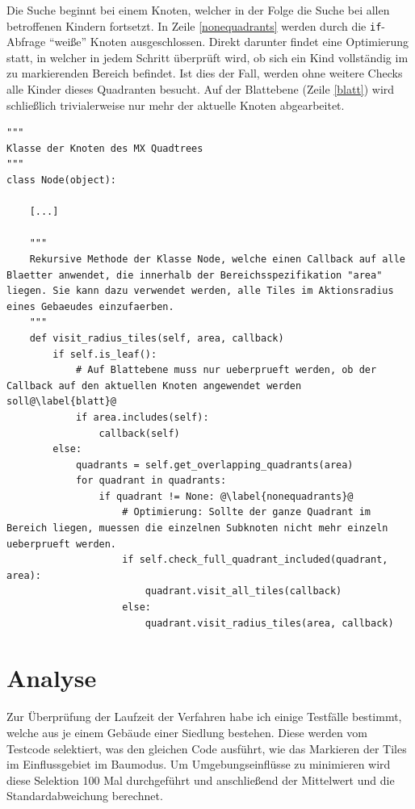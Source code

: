 \documentclass[%
			paper=a4,%
			DIV12,
			liststotoc,
			bibtotoc,
			draft=false,%
			titlepage,
			numbers=noendperiod
			]{scrartcl}
\newcommand{\inlinecode}[1]{\mbox{\texttt{#1}}}
\begin{document}
Die Suche beginnt bei einem Knoten, welcher in der Folge die Suche bei allen betroffenen Kindern fortsetzt.
In Zeile \ref{nonequadrants} werden durch die \inlinecode{if}-Abfrage "`weiße"' Knoten ausgeschlossen.
Direkt darunter findet eine Optimierung statt, in welcher in jedem Schritt überprüft wird, ob sich ein Kind vollständig im zu markierenden Bereich befindet.
Ist dies der Fall, werden ohne weitere Checks alle Kinder dieses Quadranten besucht.
Auf der Blattebene (Zeile \ref{blatt}) wird schließlich trivialerweise nur mehr der aktuelle Knoten abgearbeitet.

\begin{lstlisting}[float=h,caption=Python-ähnlicher Pseudocode zur Lösung des Markierungsproblems,label=visit_rad]
"""
Klasse der Knoten des MX Quadtrees
"""
class Node(object):

	[...]

	"""
	Rekursive Methode der Klasse Node, welche einen Callback auf alle Blaetter anwendet, die innerhalb der Bereichsspezifikation "area" liegen. Sie kann dazu verwendet werden, alle Tiles im Aktionsradius eines Gebaeudes einzufaerben.
	"""
	def visit_radius_tiles(self, area, callback)
		if self.is_leaf():
			# Auf Blattebene muss nur ueberprueft werden, ob der Callback auf den aktuellen Knoten angewendet werden soll@\label{blatt}@
			if area.includes(self):
				callback(self)
		else:
			quadrants = self.get_overlapping_quadrants(area)
			for quadrant in quadrants:
				if quadrant != None: @\label{nonequadrants}@
					# Optimierung: Sollte der ganze Quadrant im Bereich liegen, muessen die einzelnen Subknoten nicht mehr einzeln ueberprueft werden.
					if self.check_full_quadrant_included(quadrant, area):
						quadrant.visit_all_tiles(callback)
					else:
						quadrant.visit_radius_tiles(area, callback)
\end{lstlisting}

\section{Analyse}


Zur Überprüfung der Laufzeit der Verfahren habe ich einige Testfälle bestimmt, welche aus je einem Gebäude einer Siedlung bestehen.
Diese werden vom Testcode selektiert, was den gleichen Code ausführt, wie das Markieren der Tiles im Einflussgebiet im Baumodus.
Um Umgebungseinflüsse zu minimieren wird diese Selektion 100 Mal durchgeführt und anschließend der Mittelwert und die Standardabweichung berechnet.
\end{document}
